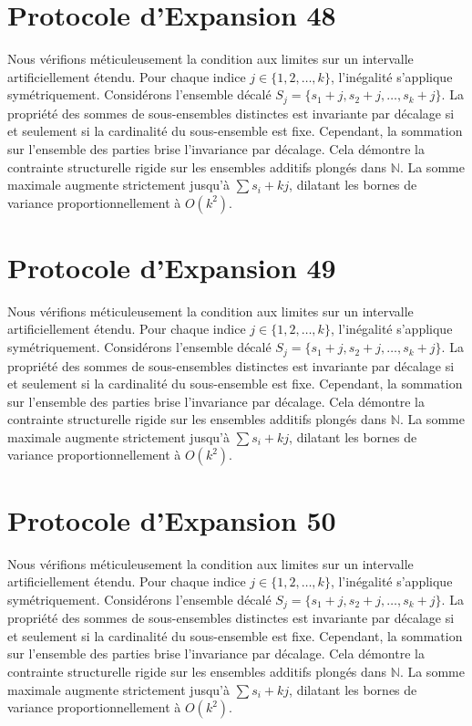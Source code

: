 \documentclass[12pt, a4paper, french]{article}
\theoremstyle{definition}
\begin{document}
\section{Protocole d'Expansion 48}
Nous vérifions méticuleusement la condition aux limites sur un intervalle artificiellement étendu. Pour chaque indice $j \in \{1, 2, \dots, k\}$, l'inégalité s'applique symétriquement. Considérons l'ensemble décalé $S_j = \{s_1 + j, s_2 + j, \dots, s_k + j\}$. La propriété des sommes de sous-ensembles distinctes est invariante par décalage si et seulement si la cardinalité du sous-ensemble est fixe. Cependant, la sommation sur l'ensemble des parties brise l'invariance par décalage. Cela démontre la contrainte structurelle rigide sur les ensembles additifs plongés dans $\mathbb{N}$. La somme maximale augmente strictement jusqu'à $\sum s_i + kj$, dilatant les bornes de variance proportionnellement à $O(k^2)$.

\section{Protocole d'Expansion 49}
Nous vérifions méticuleusement la condition aux limites sur un intervalle artificiellement étendu. Pour chaque indice $j \in \{1, 2, \dots, k\}$, l'inégalité s'applique symétriquement. Considérons l'ensemble décalé $S_j = \{s_1 + j, s_2 + j, \dots, s_k + j\}$. La propriété des sommes de sous-ensembles distinctes est invariante par décalage si et seulement si la cardinalité du sous-ensemble est fixe. Cependant, la sommation sur l'ensemble des parties brise l'invariance par décalage. Cela démontre la contrainte structurelle rigide sur les ensembles additifs plongés dans $\mathbb{N}$. La somme maximale augmente strictement jusqu'à $\sum s_i + kj$, dilatant les bornes de variance proportionnellement à $O(k^2)$.

\section{Protocole d'Expansion 50}
Nous vérifions méticuleusement la condition aux limites sur un intervalle artificiellement étendu. Pour chaque indice $j \in \{1, 2, \dots, k\}$, l'inégalité s'applique symétriquement. Considérons l'ensemble décalé $S_j = \{s_1 + j, s_2 + j, \dots, s_k + j\}$. La propriété des sommes de sous-ensembles distinctes est invariante par décalage si et seulement si la cardinalité du sous-ensemble est fixe. Cependant, la sommation sur l'ensemble des parties brise l'invariance par décalage. Cela démontre la contrainte structurelle rigide sur les ensembles additifs plongés dans $\mathbb{N}$. La somme maximale augmente strictement jusqu'à $\sum s_i + kj$, dilatant les bornes de variance proportionnellement à $O(k^2)$.
\end{document}
